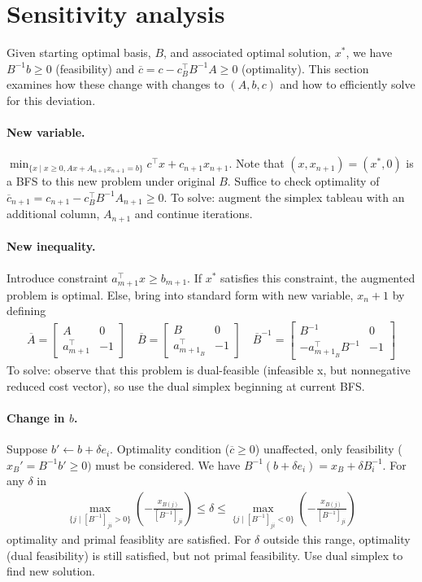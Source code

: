 \documentclass{article}
\begin{document}
\section{Sensitivity analysis}
Given starting optimal basis, $B$, and associated optimal solution, $x^*$, we have $B^{-1}b \geq 0$ (feasibility) and $\overline c = c - c_B^\top B^{-1}A \geq 0$ (optimality). This section examines how these change with changes to $(A,b,c)$ and how to efficiently solve for this deviation.


\paragraph{New variable.} $\min_{\{x\mid x\geq 0, Ax + A_{n+1}x_{n+1} = b\}}c^\top x + c_{n+1}x_{n+1}$. Note that $(x, x_{n+1}) = (x^*,0)$ is a BFS to this new problem under original $B$. Suffice to check optimality of $\overline c_{n+1} = c_{n+1} - c^\top_BB^{-1}A_{n+1}\geq 0$. To solve: augment the simplex tableau with an additional column, $A_{n+1}$ and continue iterations.

\paragraph{New inequality.} Introduce constraint $a_{m+1}^\top x\geq b_{m+1}$. If $x^*$ satisfies this constraint, the augmented problem is optimal. Else, bring into standard form with new variable, $x_n+1$ by defining
\begin{align*}
    \overline A = \begin{bmatrix}A & 0\\a^\top_{m+1}&-1\end{bmatrix} \quad
    \overline B = \begin{bmatrix}B & 0\\a^\top_{{m+1}_B}&-1\end{bmatrix} \quad
    \overline B^{-1} = \begin{bmatrix}B^{-1} & 0\\-a^\top_{{m+1}_B}B^{-1}&-1\end{bmatrix}
\end{align*}
To solve: observe that this problem is dual-feasible (infeasible x, but nonnegative reduced cost vector), so use the dual simplex beginning at current BFS. 

\paragraph{Change in $b$.} Suppose $b'\leftarrow b + \delta e_i$. Optimality condition ($\overline c\geq 0$) unaffected, only feasibility ($x_B' = B^{-1}b'\geq 0)$ must be considered. We have $B^{-1}(b + \delta e_i) = x_B + \delta B^{-1}_i$. For any $\delta$ in 
\begin{align*}
    \max_{\{j\mid [B^{-1}]_{ji}>0\}}\left(-\frac{x_{B(j)}}{[B^{-1}]_{ji}}\right) \leq \delta \leq 
    \max_{\{j\mid [B^{-1}]_{ji}<0\}}\left(-\frac{x_{B(j)}}{[B^{-1}]_{ji}}\right)
\end{align*}
optimality and primal feasiblity are satisfied. For $\delta$ outside this range, optimality (dual feasibility) is still satisfied, but not primal feasibility. Use dual simplex to find new solution.
\end{document}
